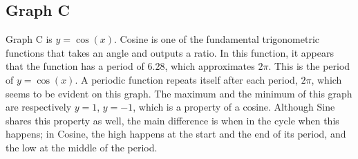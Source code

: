 \subsection{Graph C}

Graph C is $y=\cos(x)$.
Cosine is one of the fundamental trigonometric functions that takes an angle and outputs a ratio.
In this function, it appears that the function has a period of ${6.28}$, which approximates ${2\pi}$.
This is the period of $y=\cos(x)$.
A periodic function repeats itself after each period, $2\pi$, which seems to be evident on this graph.
The maximum and the minimum of this graph are respectively $y={1}$, $y={-1}$, which is a property of a cosine.
Although Sine shares this property as well, the main difference is when in the cycle when this happens; in Cosine, the high happens at the start and the end of its period, and the low at the middle of the period.
